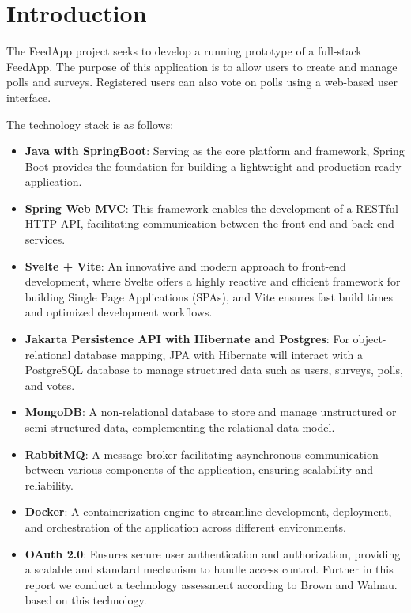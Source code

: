 \section{Introduction}
\label{sec:introduction}

The FeedApp project seeks to develop a running prototype of a full-stack FeedApp. The purpose of this application is to allow users to create and manage polls and surveys. Registered users can also vote on polls using a web-based user interface. 
\medskip

\noindent
The technology stack is as follows:
\begin{itemize}
\item \textbf{Java with SpringBoot}: Serving as the core platform and framework, Spring Boot provides the foundation for building a lightweight and production-ready application.
\item \textbf{Spring Web MVC}: This framework enables the development of a RESTful HTTP API, facilitating communication between the front-end and back-end services.
\item \textbf{Svelte + Vite}: An innovative and modern approach to front-end development, where Svelte offers a highly reactive and efficient framework for building Single Page Applications (SPAs), and Vite ensures fast build times and optimized development workflows.
\item \textbf{Jakarta Persistence API with Hibernate and Postgres}:  For object-relational database mapping, JPA with Hibernate will interact with a PostgreSQL database to manage structured data such as users, surveys, polls, and votes.
\item \textbf{MongoDB}: A non-relational database to store and manage unstructured or semi-structured data, complementing the relational data model.
\item \textbf{RabbitMQ}: A message broker facilitating asynchronous communication between various components of the application, ensuring scalability and reliability.
\item \textbf{Docker}: A containerization engine to streamline development, deployment, and orchestration of the application across different environments.
\item \textbf{OAuth 2.0}: Ensures secure user authentication and authorization, providing a scalable and standard mechanism to handle access control. Further in this report we conduct a technology assessment according to Brown and Walnau.\cite{brown:96} based on this technology.
\end{itemize}


